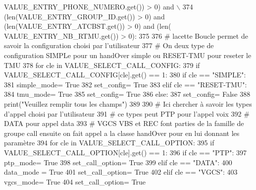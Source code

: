 \begin{DoxyCode}
      VALUE\_ENTRY\_PHONE\_NUMERO.get()) > 0) \textcolor{keywordflow}{and} \(\backslash\)
374     (len(VALUE\_ENTRY\_GROUP\_ID.get()) > 0) \textcolor{keywordflow}{and} (len(VALUE\_ENTRY\_ATCBST.get()) > 0) \textcolor{keywordflow}{and} (len(
      VALUE\_ENTRY\_NB\_RTMU.get()) > 0):
375         
376         \textcolor{comment}{# lacette Boucle permet de savoir la configuration choisi par l'utilisateur
}
377         \textcolor{comment}{# On  deux type de configuration SIMPLe pour un handOver simple ou RESET-TMU pour reseter le TMU
}
378         \textcolor{keywordflow}{for} cle \textcolor{keywordflow}{in} VALUE\_SELECT\_CALL\_CONFIG:
379             \textcolor{keywordflow}{if} VALUE\_SELECT\_CALL\_CONFIG[cle].get() == 1:
380                 \textcolor{keywordflow}{if} cle == \textcolor{stringliteral}{"SIMPLE"}:
381                     simple\_mode= \textcolor{keyword}{True}
382                     set\_config= \textcolor{keyword}{True}
383                 \textcolor{keywordflow}{elif} cle == \textcolor{stringliteral}{"RESET-TMU"}:
384                     tmu\_mode= \textcolor{keyword}{True}
385                     set\_config= \textcolor{keyword}{True}
386                 \textcolor{keywordflow}{else}:
387                     set\_config= \textcolor{keyword}{False}
388                     print(\textcolor{stringliteral}{"Veuillez remplir tous les champs"})
389 
390         \textcolor{comment}{# Ici chercher à savoir les types d'appel choisi par l'utilisateur
}
391         \textcolor{comment}{# ce types peut PTP pour l'appel voix
}
392         \textcolor{comment}{# DATA pour appel data
}
393         \textcolor{comment}{# VGCS VBS et REC font parties de la famille de groupe call ensuite on fait appel a la classe
       handOver pour en lui donnant les paramètre
}
394         \textcolor{keywordflow}{for} cle \textcolor{keywordflow}{in} VALUE\_SELECT\_CALL\_OPTION:
395             \textcolor{keywordflow}{if} VALUE\_SELECT\_CALL\_OPTION[cle].get() == 1:
396                 \textcolor{keywordflow}{if} cle == \textcolor{stringliteral}{"PTP"}:
397                     ptp\_mode= \textcolor{keyword}{True}
398                     set\_call\_option= \textcolor{keyword}{True}
399                 \textcolor{keywordflow}{elif} cle == \textcolor{stringliteral}{"DATA"}:
400                     data\_mode = \textcolor{keyword}{True}
401                     set\_call\_option= \textcolor{keyword}{True}
402                 \textcolor{keywordflow}{elif} cle == \textcolor{stringliteral}{"VGCS"}:
403                     vgcs\_mode= \textcolor{keyword}{True}
404                     set\_call\_option= \textcolor{keyword}{True}

\end{DoxyCode}
